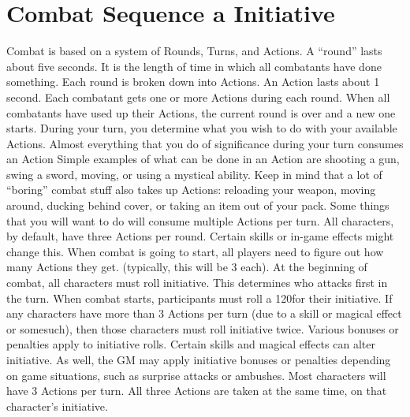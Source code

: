 \documentclass[twoside]{book}
\begin{document}
\section{Combat Sequence a Initiative}
     Combat is based on a system of Rounds, Turns, and
             Actions. A “round” lasts about five seconds. It
             is the length of time in which all combatants have done
             something. Each round is broken down into Actions. An Action
             lasts about 1 second. Each combatant gets one or more
             Actions during each round. When all combatants have used up
             their Actions, the current round is over and a new one
             starts.  During your turn, you determine what you wish to do
             with your available Actions. Almost everything that you do
             of significance during your turn consumes an Action Simple
             examples of what can be done in an Action are shooting a
             gun, swing a sword, moving, or using a mystical ability.
             Keep in mind that a lot of “boring” combat stuff
             also takes up Actions: reloading your weapon, moving around,
             ducking behind cover, or taking an item out of your pack.
             Some things that you will want to do will consume multiple
             Actions per turn.  All characters, by default, have three Actions per
             round. Certain skills or in-game effects might change this.
             When combat is going to start, all players need to figure
             out how many Actions they get. (typically, this will be 3
             each).  At the beginning of combat, all characters must roll
             initiative. This determines who attacks first in the turn.
             When combat starts, participants must roll a 120for their
             initiative. If any characters have more than 3 Actions per
             turn (due to a skill or magical effect or somesuch), then
             those characters must roll initiative twice.  Various bonuses or penalties apply to initiative
             rolls. Certain skills and magical effects can alter
             initiative. As well, the GM may apply initiative bonuses or
             penalties depending on game situations, such as surprise
             attacks or ambushes.  Most characters will have 3 Actions per turn. All
             three Actions are taken at the same time, on that
             character’s initiative. 
\end{document}
